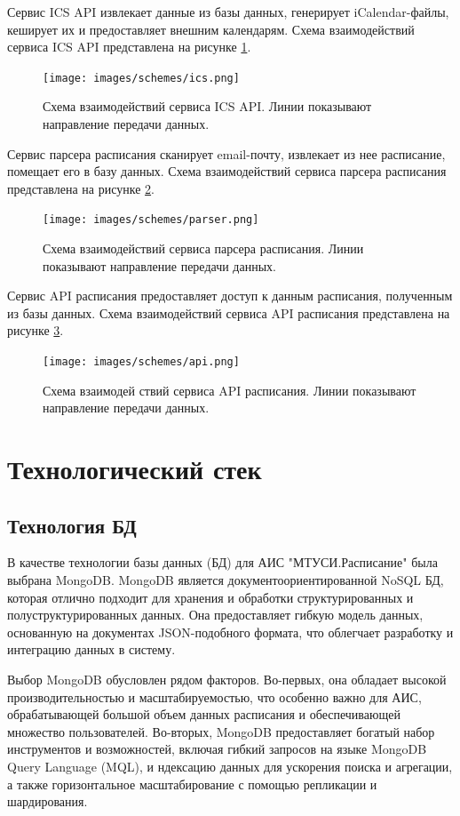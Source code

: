 Сервис ICS API извлекает данные из базы данных, генерирует
iCalendar-файлы, кеширует их и предоставляет внешним календарям.
Схема взаимодействий сервиса ICS API представлена на рисунке \ref{fig:schemes:ics}.

\begin{figure}
  \centering
  \texttt{[image: images/schemes/ics.png]}
  \caption{Схема взаимодействий сервиса ICS API. Линии показывают направление передачи данных.}
  \label{fig:schemes:ics}
\end{figure}

Сервис парсера расписания сканирует email-почту, извлекает из нее расписание, помещает его в базу данных.
Схема взаимодействий сервиса парсера расписания представлена на рисунке \ref{fig:schemes:parser}.

\begin{figure}
  \centering
  \texttt{[image: images/schemes/parser.png]}
  \caption{Схема взаимодействий сервиса парсера расписания. Линии показывают направление передачи данных.}
  \label{fig:schemes:parser}
\end{figure}

Сервис API расписания предоставляет доступ к данным расписания,
полученным из базы данных. Схема взаимодействий сервиса API расписания представлена на рисунке \ref{fig:schemes:api}.

\begin{figure}
  \centering
  \texttt{[image: images/schemes/api.png]}
  \caption{Схема взаимодей ствий сервиса API расписания. Линии показывают направление передачи данных.}
  \label{fig:schemes:api}
\end{figure}

\section{Технологический стек}

\subsection{Технология БД}
В качестве технологии базы данных (БД) для АИС "МТУСИ.Расписание"
была выбрана MongoDB. MongoDB является документоориентированной NoSQL БД,
которая отлично подходит для хранения и
обработки структурированных и полуструктурированных данных.
Она предоставляет гибкую модель данных,
основанную на документах JSON-подобного формата,
что облегчает разработку и интеграцию данных в систему.

Выбор MongoDB обусловлен рядом факторов. Во-первых, она обладает высокой производительностью и масштабируемостью,
что особенно важно для АИС, обрабатывающей большой объем данных расписания и обеспечивающей множество пользователей.
Во-вторых, MongoDB предоставляет богатый набор инструментов и возможностей,
включая гибкий запросов на языке MongoDB Query Language (MQL), и
ндексацию данных для ускорения поиска и агрегации, а также горизонтальное
масштабирование с помощью репликации и шардирования.

